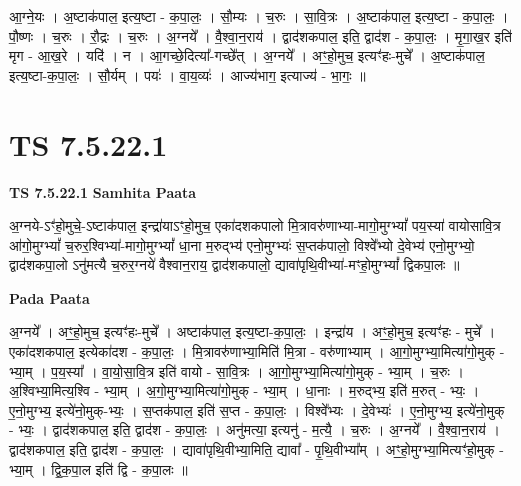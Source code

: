 \documentclass[17pt]{extarticle}
\begin{document}
आ॒ग्ने॒यः । अ॒ष्टाक॑पाल॒ इत्य॒ष्टा - क॒पा॒लः॒ । सौ॒म्यः । च॒रुः । सा॒वि॒त्रः । अ॒ष्टाक॑पाल॒ इत्य॒ष्टा - क॒पा॒लः॒ । पौ॒ष्णः । च॒रुः । रौ॒द्रः । च॒रुः । अ॒ग्नये᳚ । वै॒श्वा॒न॒राय॑ । द्वाद॑शकपाल॒ इति॒ द्वाद॑श - क॒पा॒लः॒ । मृ॒गा॒ख॒र इति॑ मृग - आ॒ख॒रे । यदि॑ । न । आ॒गच्छे॒दित्या᳚-गच्छे᳚त् । अ॒ग्नये᳚ । अꣳ॒॒हो॒मुच॒ इत्यꣳ॑हः-मुचे᳚ । अ॒ष्टाक॑पाल॒ इत्य॒ष्टा-क॒पा॒लः॒ । सौ॒र्यम् । पयः॑ । वा॒य॒व्यः॑ । आज्य॑भाग॒ इत्याज्य॑ - भा॒गः॒ ॥  \newline




\section*{ TS 7.5.22.1 }

\textbf{TS 7.5.22.1 } \newline
\textbf{Samhita Paata} \newline

अ॒ग्नये-ऽꣳ॑हो॒मुचे॒-ऽष्टाक॑पाल॒ इन्द्रा॑याऽꣳहो॒मुच॒ एका॑दशकपालो मि॒त्रावरु॑णाभ्या-मागो॒मुग्भ्यां᳚ पय॒स्या॑ वायोसावि॒त्र आ॑गो॒मुग्भ्यां᳚ च॒रुर॒श्विभ्या॑-मागो॒मुग्भ्यां᳚ धा॒ना म॒रुद्भ्य॑ एनो॒मुग्भ्यः॑ स॒प्तक॑पालो॒ विश्वे᳚भ्यो दे॒वेभ्य॑ एनो॒मुग्भ्यो॒ द्वाद॑शकपा॒लो ऽनु॑मत्यै च॒रुर॒ग्नये॑ वैश्वान॒राय॒ द्वाद॑शकपालो॒ द्यावा॑पृथि॒वीभ्या॑-मꣳहो॒मुग्भ्यां᳚ द्विकपा॒लः ॥ \newline

\textbf{Pada Paata} \newline

अ॒ग्नये᳚ । अꣳ॒॒हो॒मुच॒ इत्यꣳ॑हः-मुचे᳚ । अष्टाक॑पाल॒ इत्य॒ष्टा-क॒पा॒लः॒ । इन्द्रा॑य । अꣳ॒॒हो॒मुच॒ इत्यꣳ॑हः - मुचे᳚ । एका॑दशकपाल॒ इत्येका॑दश - क॒पा॒लः॒ । मि॒त्रावरु॑णाभ्या॒मिति॑ मि॒त्रा - वरु॑णाभ्याम् । आ॒गो॒मुग्भ्या॒मित्या॑गो॒मुक् - भ्या॒म् । प॒य॒स्या᳚ । वा॒यो॒सा॒वि॒त्र इति॑ वायो - सा॒वि॒त्रः । आ॒गो॒मुग्भ्या॒मित्या॑गो॒मुक् - भ्या॒म् । च॒रुः । अ॒श्विभ्या॒मित्य॒श्वि - भ्या॒म् । अ॒गो॒मुग्भ्या॒मित्या॑गो॒मुक् - भ्या॒म् । धा॒नाः । म॒रुद्भ्य॒ इति॑ म॒रुत् - भ्यः॒ । ए॒नो॒मुग्भ्य॒ इत्ये॑नो॒मुक्-भ्यः॒ । स॒प्तक॑पाल॒ इति॑ स॒प्त - क॒पा॒लः॒ । विश्वे᳚भ्यः । दे॒वेभ्यः॑ । ए॒नो॒मुग्भ्य॒ इत्ये॑नो॒मुक् - भ्यः॒ । द्वाद॑शकपाल॒ इति॒ द्वाद॑श - क॒पा॒लः॒ । अनु॑मत्या॒ इत्यनु॑ - म॒त्यै॒ । च॒रुः । अ॒ग्नये᳚ । वै॒श्वा॒न॒राय॑ । द्वाद॑शकपाल॒ इति॒ द्वाद॑श - क॒पा॒लः॒ । द्यावा॑पृथि॒वीभ्या॒मिति॒ द्यावा᳚ - पृ॒थि॒वीभ्या᳚म् । अꣳ॒॒हो॒मुग्भ्या॒मित्यꣳ॑हो॒मुक् - भ्या॒म् । द्वि॒क॒पा॒ल इति॑ द्वि - क॒पा॒लः ॥  \newline
\end{document}
